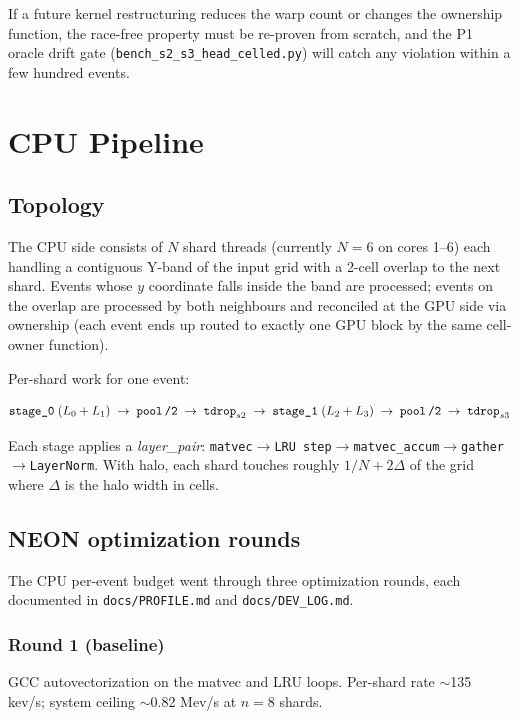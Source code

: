 \documentclass[11pt,a4paper]{article}
\begin{document}
If a future kernel restructuring reduces the warp count or changes the
ownership function, the race-free property must be re-proven from
scratch, and the P1 oracle drift gate
(\texttt{bench\_s2\_s3\_head\_celled.py}) will catch any violation
within a few hundred events.

\section{CPU Pipeline}

\subsection{Topology}

The CPU side consists of $N$ shard threads (currently $N=6$ on cores
1--6) each handling a contiguous Y-band of the input grid with a 2-cell
overlap to the next shard. Events whose $y$ coordinate falls inside the
band are processed; events on the overlap are processed by both
neighbours and reconciled at the GPU side via ownership (each event
ends up routed to exactly one GPU block by the same cell-owner
function).

Per-shard work for one event:

\[
  \texttt{stage\_0}\;(L_0 + L_1) \;\to\; \texttt{pool\,/2} \;\to\; \texttt{tdrop}_{s2}
  \;\to\; \texttt{stage\_1}\;(L_2 + L_3) \;\to\; \texttt{pool\,/2} \;\to\; \texttt{tdrop}_{s3}
\]

Each stage applies a \emph{layer\_pair}: \texttt{matvec\(\to\)LRU
step\(\to\)matvec\_accum\(\to\)gather\(\to\)LayerNorm}. With halo,
each shard touches roughly $1/N + 2\Delta$ of the grid where $\Delta$
is the halo width in cells.

\subsection{NEON optimization rounds}

The CPU per-event budget went through three optimization rounds, each
documented in \texttt{docs/PROFILE.md} and \texttt{docs/DEV\_LOG.md}.

\subsubsection*{Round 1 (baseline)}

GCC autovectorization on the matvec and LRU loops. Per-shard rate
$\sim$135 kev/s; system ceiling $\sim$0.82 Mev/s at $n=8$ shards.
\end{document}
